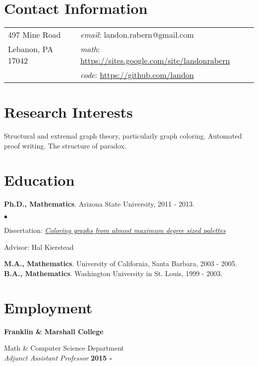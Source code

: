 \documentclass[margin,line]{res}
\newenvironment{list2}{
  \begin{list}{$\bullet$}{%
      \setlength{\itemsep}{0in}
      \setlength{\parsep}{0in} \setlength{\parskip}{0in}
      \setlength{\topsep}{0in} \setlength{\partopsep}{0in} 
      \setlength{\leftmargin}{0.2in}}}{\end{list}}
\begin{document}

\begin{resume}
\section{\sc Contact Information}
\vspace{.05in}
\begin{tabular}{@{}p{2in}p{4in}}     
497 Mine Road & \qquad\qquad\textit{email}: landon.rabern@gmail.com \\   
Lebanon, PA 17042 & \qquad\qquad \textit{math}: \url{https://sites.google.com/site/landonrabern} \\
& \qquad\qquad \textit{code}: \href{https://github.com/landon?tab=repositories}{https://github.com/landon}
\end{tabular}

\section{\sc Research Interests}
Structural and extremal graph theory, particularly graph coloring. Automated proof writing. The structure of paradox.

\bigskip

\section{\sc Education}
{\bf Ph.D., Mathematics}. Arizona State University, 2011 - 2013.
\begin{list2}
\item Dissertation: \textit{\href{https://dl.dropbox.com/u/8609833/Papers/main_fancy.pdf}{Coloring graphs from almost maximum degree sized palettes}}
\item Advisor: Hal Kierstead
\end{list2}
{\bf M.A., Mathematics}. University of California, Santa Barbara, 2003 - 2005.\\
{\bf  B.A., Mathematics}. Washington University in St. Louis, 1999 - 2003.

\section{\sc Employment}
{\bf Franklin \& Marshall College}

\vspace{-.4cm}
Math \& Computer Science Department \\
{\em Adjunct Assistant Professor} \hfill {\bf 2015 - \phantom{2017}} 


\end{resume}
\end{document}
